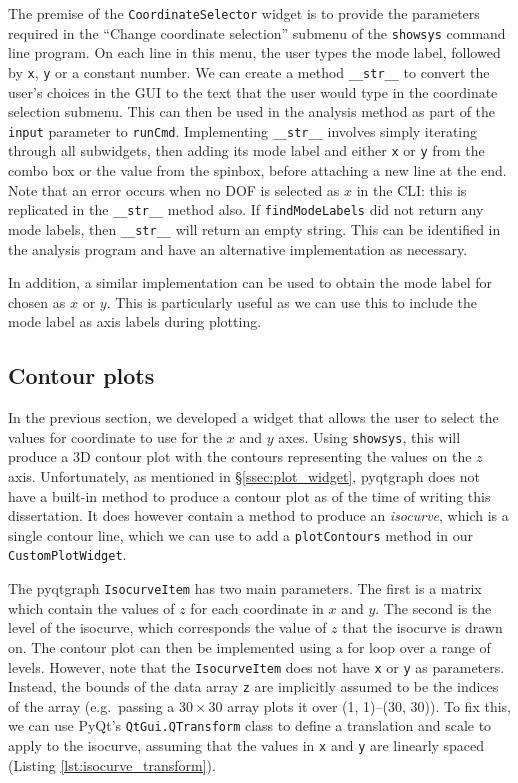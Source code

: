 \documentclass[12pt]{article}
\begin{document}
The premise of the \texttt{CoordinateSelector} widget is to provide the parameters required in the ``Change coordinate selection'' submenu of the \texttt{showsys} command line program. On each line in this menu, the user types the mode label, followed by \texttt{x}, \texttt{y} or a constant number. We can create a method \texttt{\_\_str\_\_} to convert the user's choices in the GUI to the text that the user would type in the coordinate selection submenu. This can then be used in the analysis method as part of the \texttt{input} parameter to \texttt{runCmd}. Implementing \texttt{\_\_str\_\_} involves simply iterating through all subwidgets, then adding its mode label and either \texttt{x} or \texttt{y} from the combo box or the value from the spinbox, before attaching a new line at the end. Note that an error occurs when no DOF is selected as \(x\) in the CLI: this is replicated in the \texttt{\_\_str\_\_} method also. If \texttt{findModeLabels} did not return any mode labels, then \texttt{\_\_str\_\_} will return an empty string. This can be identified in the analysis program and have an alternative implementation as necessary.

In addition, a similar implementation can be used to obtain the mode label for chosen as \(x\) or \(y\). This is particularly useful as we can use this to include the mode label as axis labels during plotting.

\subsection{Contour plots}\label{ssec:contour}

In the previous section, we developed a widget that allows the user to select the values for coordinate to use for the \(x\) and \(y\) axes. Using \texttt{showsys}, this will produce a 3D contour plot with the contours representing the values on the \(z\) axis. Unfortunately, as mentioned in \S\ref{ssec:plot_widget}, pyqtgraph does not have a built-in method to produce a contour plot as of the time of writing this dissertation. It does however contain a method to produce an \textit{isocurve}, which is a single contour line, which we can use to add a \texttt{plotContours} method in our \texttt{CustomPlotWidget}.

The pyqtgraph \texttt{IsocurveItem} has two main parameters. The first is a matrix which contain the values of \(z\) for each coordinate in \(x\) and \(y\). The second is the level of the isocurve, which corresponds the value of \(z\) that the isocurve is drawn on. The contour plot can then be implemented using a for loop over a range of levels. However, note that the \texttt{IsocurveItem} does not have \texttt{x} or \texttt{y} as parameters. Instead, the bounds of the data array \texttt{z} are implicitly assumed to be the indices of the array (e.g.~passing a \(30\times 30\) array plots it over (1, 1)--(30, 30)). To fix this, we can use PyQt's \texttt{QtGui.QTransform} class to define a translation and scale to apply to the isocurve, assuming that the values in \texttt{x} and \texttt{y} are linearly spaced (Listing \ref{lst:isocurve_transform}).
\end{document}
